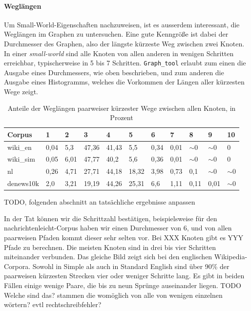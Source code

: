 \documentclass[12pt, a4paper]{article}
\begin{document}

\paragraph{Wegl\"angen}
Um Small-World-Eigenschaften nachzuweisen, ist es ausserdem interessant, die
Weglängen im Graphen zu untersuchen. Eine gute Kenngröße ist dabei der Durchmesser
des Graphen, also der längste kürzeste Weg zwischen zwei Knoten. In einer
\emph{small-world} sind alle Knoten von allen anderen in wenigen Schritten
erreichbar, typischerweise in 5 bis 7 Schritten. \texttt{Graph\_tool}
erlaubt zum einen die Ausgabe eines Durchmessers, wie oben beschrieben, und zum
anderen die Ausgabe eines Histogramms, welches die Vorkommen der Längen aller
kürzesten Wege zeigt.

\begin{table}[h]
  \centering
  \begin{tabular}{l|llllllllll}
    Corpus      & 1      & 2      & 3       & 4       & 5       & 6      & 7      & 8             & 9             & 10           \\
\hline
    wiki\_en    & 0,04 & 5,3  & 47,36 & 41,43 & 5,5   & 0,34 & 0,01 & $\sim$0  & $\sim$0  & 0          \\
    wiki\_sim   & 0,05 & 6,01 & 47,77 & 40,2  & 5,6   & 0,36 & 0,01 & $\sim$0  & $\sim$0  & 0          \\
    nl          & 0,26 & 4,71 & 27,71 & 44,18 & 18,32 & 3,98 & 0,73 & 0,1         & $\sim$0  & $\sim$0 \\
    denews10k   & 2,0    & 3,21 & 19,19 & 44,26 & 25,31 & 6,6  & 1,11 & 0,11        & 0,01        & $\sim$0 \\
  \end{tabular}
  \caption{Anteile der Weglängen paarweiser kürzester Wege zwischen allen Knoten, in Prozent}
\end{table}

TODO, folgenden abschnitt an tatsächliche ergebnisse anpassen 

In der Tat können wir die Schrittzahl bestätigen, beispielsweise für den
nachrichtenleicht-Corpus haben wir einen Durchmesser von 6, und von
allen paarweisen Pfaden kommt dieser sehr selten vor. Bei XXX Knoten gibt
es YYY Pfade zu berechnen. Die meisten Knoten sind in drei bis vier Schritten
miteinander verbunden.
Das gleiche Bild zeigt sich bei den englischen Wikipedia-Corpora. Sowohl in 
Simple als auch in Standard English sind über 90\% der paarweisen
kürzesten Strecken vier oder weniger Schritte lang. Es gibt in beiden Fällen 
einige wenige Paare, die bis zu neun Sprünge auseinander liegen.
TODO Welche sind das? stammen die womöglich von alle von wenigen einzelnen wörtern? evtl rechtschreibfehler? 
\end{document}
